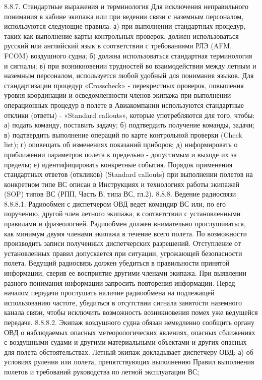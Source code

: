 8.8.7. Стандартные выражения и терминология
Для исключения неправильного понимания в кабине экипажа или при ведении связи с наземным персоналом, используются следующие правила:
а)	при выполнении стандартных процедур, таких как выполнение карты контрольных проверок, должен использоваться русский или английский язык в соответствии с требованиями РЛЭ (AFM, FCOM) воздушного судна;
б)	должна использоваться стандартная терминология и сигналы;
в)	при возникновении трудностей во взаимодействии между летным и наземным персоналом, используется любой удобный для понимания языков.
Для стандартизации процедур «Сrosscheck» - перекрестных проверок, повышения уровня координации и осведомленности членов экипажа при выполнении операционных процедур в полете в Авиакомпании используются стандартные отклики (ответы) - «Standard callouts», которые употребляются для того, чтобы:
а)	подать команду, поставить задачу;
б)	подтвердить получение команды, задачи;
в)	подтвердить выполнение операций по карте контрольной проверки (Check list);
г)	оповещать об изменениях показаний приборов;
д)	информировать о приближении параметров полета к предельно - допустимым и выходе их за пределы;
е)	идентифицировать конкретные события.
Порядок применения стандартных ответов (откликов) (Standard callouts) при выполнении полетов на конкретном типе ВС описан в Инструкциях и технологиях работы экипажей (SOP) типов ВС (РПП, Часть В, типа ВС, гл.2).
8.8.8. Ведение радиосвязи
8.8.8.1. Радиообмен с диспетчером ОВД ведет командир ВС или, по его поручению, другой член летного экипажа, в соответствии с установленными правилами и фразеологией. Радиообмен должен внимательно прослушиваться, как минимум двумя членами экипажа в течение всего полета. По возможности производить записи полученных диспетчерских разрешений.
Отступление от установленных правил допускается при ситуации, угрожающей безопасности полета. Ведущий радиосвязь должен убедиться в правильности принятой информации, сверив ее восприятие другими членами экипажа. При выявлении разного понимания информации запросить повторения информации.
Перед началом передачи прослушать наличие радиообмена на подлежащей использованию частоте, убедиться в отсутствии сигнала занятости наземного канала связи, чтобы исключить возможность возникновения помех уже ведущейся передаче.
8.8.8.2. Экипаж воздушного судна обязан немедленно сообщить органу ОВД о наблюдаемых опасных метеорологических явлениях, опасных сближениях с воздушными судами и другими материальными объектами и других опасных для полета обстоятельствах.
Летный экипаж докладывает диспетчеру ОВД:
а)	об условиях руления или полета, препятствующих выполнению Правил выполнения полетов и требований руководства по летной эксплуатации ВС;
